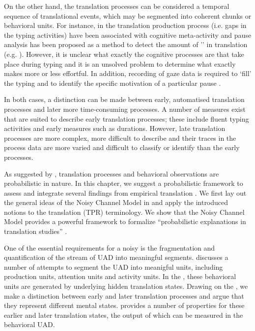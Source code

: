 \documentclass[output=paper]{LSP/langsci}
\begin{document}
On the other hand, the translation processes can be considered a temporal sequence of translational events, which may be segmented into coherent chunks or behavioral units. For instance,  in the translation production process (i.e. gaps in the typing activities) have been associated with cognitive meta-activity and pause analysis has been proposed as a method to detect the amount of '' in translation (e.g. \citealt{Immonen2006, Obrien2006, Lacruz2012}). However, it is unclear what exactly the cognitive processes are that take place during typing  and it is an unsolved problem to determine what exactly makes  more or less effortful. In addition, recording of gaze data is required to `fill' the typing  and to identify the specific motivation of a particular pause \citep[47]{Kumpulainen2015}. 

In both cases, a distinction can be made between early, automatised translation processes and later more time-consuming processes. A number of measures exist that are suited to describe early translation processes; these include fluent typing activities and early  measures such as  durations. However, late translation processes are more complex, more difficult to describe and their traces in the process data are more varied and difficult to classify or identify than the early processes.

As suggested by \citet{Toury2004}, translation processes and behavioral observations are probabilistic in nature. In this chapter, we suggest a probabilistic framework to assess and integrate several findings from empirical translation . We first lay out the general ideas of the Noisy Channel Model in  and apply the introduced notions to the translation  (TPR) terminology. We show that the Noisy Channel Model provides a powerful framework to formalize ``probabilistic explanations in translation studies'' \citep{Toury2004}. 

One of the essential requirements for a noisy  is the fragmentation and quantification of the stream of UAD  into meaningful segments.  discusses a number of attempts to segment the UAD into meanigful units, including production units, attention units and activity units. In the , these behavioral units are generated by underlying hidden translation states. Drawing on the , we make a distinction between early and later translation processes and argue that they represent different mental states.  provides a number of properties for these earlier and later translation states, the output of which can be measured in the behavioral UAD.
\end{document}

